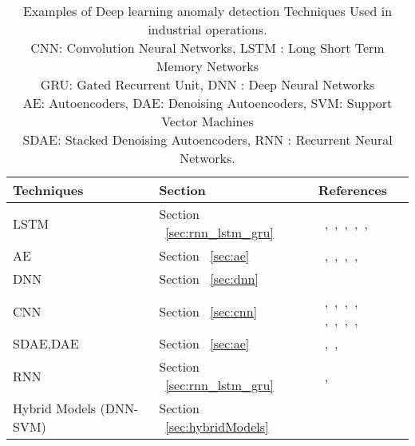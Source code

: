 \begin{table*}
\begin{center}
\caption{Examples of Deep learning anomaly detection Techniques Used in industrial operations.
        \\CNN: Convolution Neural Networks, LSTM : Long Short Term Memory Networks
        \\GRU: Gated Recurrent Unit, DNN : Deep Neural Networks
        \\AE: Autoencoders, DAE: Denoising Autoencoders, SVM: Support Vector Machines
        \\SDAE: Stacked Denoising Autoencoders, RNN : Recurrent Neural Networks.}
    \label{tab:industrialDamageDetect}
    \begin{tabular}{ | l | p{2cm} | p{6cm} |}
    \hline
     \textbf{Techniques}  & \textbf{Section} & \textbf{References} \\ \hline
     LSTM & Section ~\ref{sec:rnn_lstm_gru} &  ~\cite{inoue2017anomaly},~\cite{thi2017one},~\cite{kravchik2018detecting},~\cite{huang2018deep},~\cite{park2018lired},~\cite{chang2018review}\\\hline
     AE & Section ~\ref{sec:ae} & ~\cite{yuan2015distributed},~\cite{araya2017ensemble},~\cite{qu2017detection},~\cite{sakurada2014anomaly},~\cite{bhattad2018detecting}\\\hline
     DNN & Section ~\ref{sec:dnn} & ~\cite{lodhi2017power}\\\hline
     CNN & Section ~\ref{sec:cnn} & ~\cite{faghih2016deep},~\cite{christiansen2016deepanomaly},~\cite{lee2016convolutional},~\cite{faghih2016deep}, ~\cite{dong2016camera},~\cite{nanduri2016anomaly},~\cite{fuentes2017robust},~\cite{huang2018deep},~\cite{chang2018review}\\\hline
     SDAE,DAE & Section ~\ref{sec:ae} & ~\cite{yan2015accurate},~\cite{luo2017gas},~\cite{dai2017cleaning} \\\hline
     RNN & Section ~\ref{sec:rnn_lstm_gru} & ~\cite{banjanovic2017neural},~\cite{thi2017one} \\\hline
     Hybrid Models (DNN-SVM) & Section ~\ref{sec:hybridModels} & ~\cite{inoue2017anomaly} \\\hline
    \end{tabular}
\end{center}
\end{table*}











